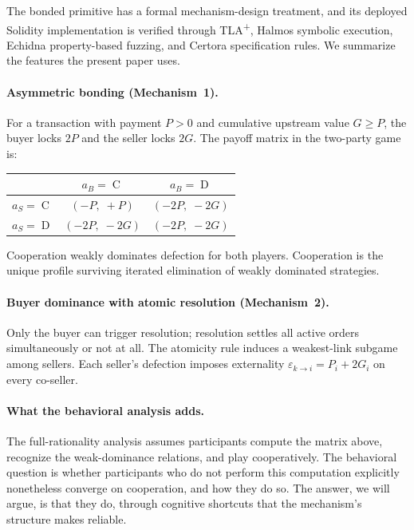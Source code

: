 \documentclass[11pt,a4paper]{article}
\theoremstyle{definition}
\theoremstyle{remark}
\newcommand{\pay}{P}
\newcommand{\cumval}{G}
\DeclareMathOperator{\Coop}{C}
\DeclareMathOperator{\Def}{D}
\begin{document}
The bonded primitive has a formal mechanism-design treatment,
and its deployed Solidity implementation is verified through
TLA\textsuperscript{+}, Halmos symbolic execution, Echidna
property-based fuzzing, and Certora specification rules. We
summarize the features the present paper uses.

\paragraph{Asymmetric bonding (Mechanism~1).}
For a transaction with payment $\pay > 0$ and cumulative upstream
value $\cumval \geq \pay$, the buyer locks $2\pay$ and the seller
locks $2\cumval$. The payoff matrix in the two-party game is:

\begin{center}
\begin{tabular}{lcc}
\toprule
 & $a_B = \Coop$ & $a_B = \Def$ \\
\midrule
$a_S = \Coop$ & $(-\pay,\; +\pay)$ & $(-2\pay,\; -2\cumval)$ \\
$a_S = \Def$  & $(-2\pay,\; -2\cumval)$ & $(-2\pay,\; -2\cumval)$ \\
\bottomrule
\end{tabular}
\end{center}

Cooperation weakly dominates defection for both players.
Cooperation is the unique profile surviving iterated elimination
of weakly dominated strategies.

\paragraph{Buyer dominance with atomic resolution (Mechanism~2).}
Only the buyer can trigger resolution; resolution settles all
active orders simultaneously or not at all. The atomicity rule
induces a weakest-link subgame among sellers. Each seller's
defection imposes externality $\varepsilon_{k \to i} = \pay_i +
2\cumval_i$ on every co-seller.

\paragraph{What the behavioral analysis adds.}
The full-rationality analysis assumes participants compute the
matrix above, recognize the weak-dominance relations, and play
cooperatively. The behavioral question is whether participants
who do not perform this computation explicitly nonetheless
converge on cooperation, and how they do so. The answer, we will
argue, is that they do, through cognitive shortcuts that the
mechanism's structure makes reliable.
\end{document}

